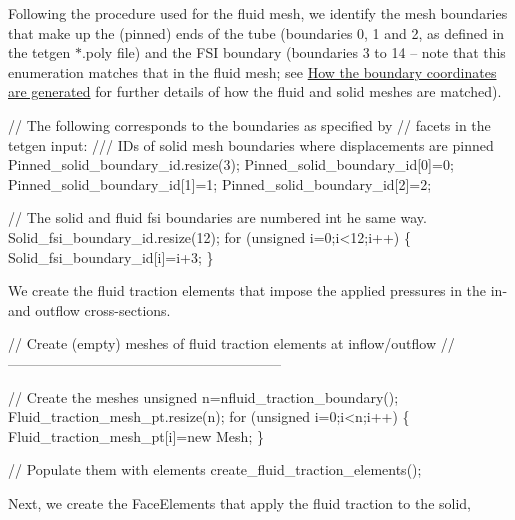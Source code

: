 Following the procedure used for the fluid mesh, we identify the mesh boundaries that make up the (pinned) ends of the tube (boundaries 0, 1 and 2, as defined in the tetgen {\ttfamily $\ast$.poly} file) and the F\+SI boundary (boundaries 3 to 14 -- note that this enumeration matches that in the fluid mesh; see \hyperlink{index_boundary_coord}{How the boundary coordinates are generated} for further details of how the fluid and solid meshes are matched).


\begin{DoxyCodeInclude}
 
 \textcolor{comment}{// The following corresponds to the boundaries as specified by}
 \textcolor{comment}{// facets in the tetgen input:}
 \textcolor{comment}{}
\textcolor{comment}{ /// IDs of solid mesh boundaries where displacements are pinned}
\textcolor{comment}{} Pinned\_solid\_boundary\_id.resize(3);
 Pinned\_solid\_boundary\_id[0]=0;
 Pinned\_solid\_boundary\_id[1]=1;
 Pinned\_solid\_boundary\_id[2]=2;
 
 \textcolor{comment}{// The solid and fluid fsi boundaries are numbered int he same way.}
 Solid\_fsi\_boundary\_id.resize(12);
 \textcolor{keywordflow}{for} (\textcolor{keywordtype}{unsigned} i=0;i<12;i++)
  \{
   Solid\_fsi\_boundary\_id[i]=i+3;
  \}

\end{DoxyCodeInclude}


We create the fluid traction elements that impose the applied pressures in the in-\/ and outflow cross-\/sections.


\begin{DoxyCodeInclude}


 
 \textcolor{comment}{// Create (empty) meshes of fluid traction elements at inflow/outflow}
 \textcolor{comment}{//-----------------------------------------------------------}
 
 \textcolor{comment}{// Create the meshes}
 \textcolor{keywordtype}{unsigned} n=nfluid\_traction\_boundary();
 Fluid\_traction\_mesh\_pt.resize(n);
 \textcolor{keywordflow}{for} (\textcolor{keywordtype}{unsigned} i=0;i<n;i++)
  \{
   Fluid\_traction\_mesh\_pt[i]=\textcolor{keyword}{new} Mesh;
  \} 
 
 \textcolor{comment}{// Populate them with elements}
 create\_fluid\_traction\_elements();

\end{DoxyCodeInclude}


Next, we create the {\ttfamily Face\+Elements} that apply the fluid traction to the solid,


